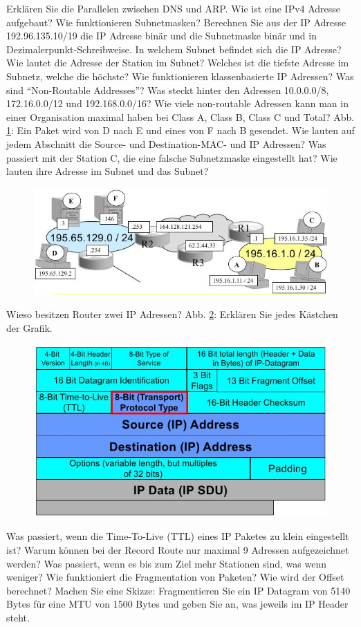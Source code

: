 \documentclass[ngerman,a4paper,12pt]{scrreprt}
\begin{document}
\olR
	\li Erklären Sie die Parallelen zwischen DNS und ARP.
	\li Wie ist eine IPv4 Adresse aufgebaut? Wie funktionieren Subnetmasken? 
	\li Berechnen Sie aus der IP Adresse 192.96.135.10/19 die IP Adresse binär und die Subnetmaske binär und in Dezimalerpunkt-Schreibweise. In welchem Subnet befindet sich die IP Adresse? Wie lautet die Adresse der Station im Subnet?  Welches ist die tiefste Adresse im Subnetz, welche die höchste?
	\li Wie funktionieren klassenbasierte IP Adressen?
	\li Was sind "`Non-Routable Addresses"'? Was steckt hinter den Adressen 10.0.0.0/8, 172.16.0.0/12 und 192.168.0.0/16?
	\li Wie viele non-routable Adressen kann man in einer Organisation maximal haben bei Class A, Class B, Class C und Total?
	\li Abb. \ref{netLayout}: Ein Paket wird von D nach E und eines von F nach B gesendet. Wie lauten auf jedem Abschnitt die Source- und Destination-MAC- und IP Adressen? Was passiert mit der Station C, die eine falsche Subnetzmaske eingestellt hat? Wie lauten ihre Adresse im Subnet und das Subnet?
	\begin{figure}[H]
		\centering
		\includegraphics[width=\textwidth]{img/R9.1.jpg}
		\caption{}
		\label{netLayout}
	\end{figure}
	\li Wieso besitzen Router zwei IP Adressen?
	\li Abb. \ref{ipDatagram}: Erklären Sie jedes Kästchen der Grafik.
		\begin{figure}[H]
		\centering
		\includegraphics[width=\textwidth]{img/V9.4.jpg}
		\caption{}
		\label{ipDatagram}
	\end{figure}
	\li Was passiert, wenn die Time-To-Live (TTL) eines IP Paketes zu klein eingestellt ist?
	\li Warum können bei der Record Route nur maximal 9 Adressen aufgezeichnet werden? Was passiert, wenn es bis zum Ziel mehr Stationen sind, was wenn weniger?
	\li Wie funktioniert die Fragmentation von Paketen? Wie wird der Offset berechnet?
	\li Machen Sie eine Skizze: Fragmentieren Sie ein IP Datagram von 5140 Bytes für eine MTU von 1500 Bytes und geben Sie an, was jeweils im IP Header steht.
\olS
\end{document}
